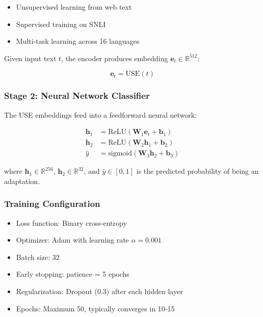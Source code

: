 \documentclass[12pt,a4paper]{article}
\begin{document}
\begin{itemize}
    \item Unsupervised learning from web text
    \item Supervised training on SNLI \cite{Bowman2015}
    \item Multi-task learning across 16 languages
\end{itemize}

Given input text $t$, the encoder produces embedding $\mathbf{e}_t \in \mathbb{R}^{512}$:

\begin{equation}
\mathbf{e}_t = \text{USE}(t)
\end{equation}

\subsubsection{Stage 2: Neural Network Classifier}

The USE embeddings feed into a feedforward neural network:

\begin{equation}
\begin{aligned}
\mathbf{h}_1 &= \text{ReLU}(\mathbf{W}_1 \mathbf{e}_t + \mathbf{b}_1) \\
\mathbf{h}_2 &= \text{ReLU}(\mathbf{W}_2 \mathbf{h}_1 + \mathbf{b}_2) \\
\hat{y} &= \text{sigmoid}(\mathbf{W}_3 \mathbf{h}_2 + \mathbf{b}_3)
\end{aligned}
\end{equation}

where $\mathbf{h}_1 \in \mathbb{R}^{256}$, $\mathbf{h}_2 \in \mathbb{R}^{32}$, and $\hat{y} \in [0,1]$ is the predicted probability of being an adaptation.

\subsubsection{Training Configuration}

\begin{itemize}
    \item Loss function: Binary cross-entropy
    \item Optimizer: Adam with learning rate $\alpha = 0.001$
    \item Batch size: 32
    \item Early stopping: patience = 5 epochs
    \item Regularization: Dropout (0.3) after each hidden layer
    \item Epochs: Maximum 50, typically converges in 10-15
\end{itemize}
\end{document}
